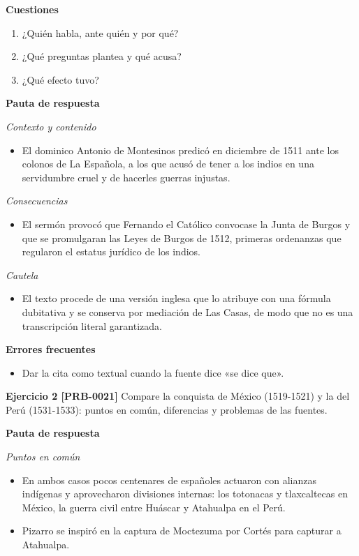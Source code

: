 \documentclass{book}
\begin{document}
\noindent\textbf{Cuestiones}
\begin{enumerate}
\item ¿Quién habla, ante quién y por qué?
\item ¿Qué preguntas plantea y qué acusa?
\item ¿Qué efecto tuvo?
\end{enumerate}

\noindent\textbf{Pauta de respuesta}

\noindent\textit{Contexto y contenido}
\begin{itemize}
\item El dominico Antonio de Montesinos predicó en diciembre de 1511 ante los colonos de La Española, a los que acusó de tener a los indios en una servidumbre cruel y de hacerles guerras injustas.
\end{itemize}

\noindent\textit{Consecuencias}
\begin{itemize}
\item El sermón provocó que Fernando el Católico convocase la Junta de Burgos y que se promulgaran las Leyes de Burgos de 1512, primeras ordenanzas que regularon el estatus jurídico de los indios.
\end{itemize}

\noindent\textit{Cautela}
\begin{itemize}
\item El texto procede de una versión inglesa que lo atribuye con una fórmula dubitativa y se conserva por mediación de Las Casas, de modo que no es una transcripción literal garantizada.
\end{itemize}

\noindent\textbf{Errores frecuentes}
\begin{itemize}
\item Dar la cita como textual cuando la fuente dice «se dice que».
\end{itemize}

\noindent\textbf{Ejercicio 2 [PRB-0021]}
Compare la conquista de México (1519-1521) y la del Perú (1531-1533): puntos en común, diferencias y problemas de las fuentes.


\noindent\textbf{Pauta de respuesta}

\noindent\textit{Puntos en común}
\begin{itemize}
\item En ambos casos pocos centenares de españoles actuaron con alianzas indígenas y aprovecharon divisiones internas: los totonacas y tlaxcaltecas en México, la guerra civil entre Huáscar y Atahualpa en el Perú.
\item Pizarro se inspiró en la captura de Moctezuma por Cortés para capturar a Atahualpa.
\end{itemize}
\end{document}
